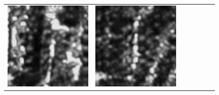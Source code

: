 \documentclass{article}
\begin{document}
\begin{table}[t]
\begin{tabular}{ccccccc}
   			\includegraphics[scale=0.32]{Images/generated_data_80x80_upsampled/168000_00773.jpg}  &
   			\includegraphics[scale=0.32]{Images/generated_data_80x80_upsampled/168000_00806.jpg}  \\
   			

\end{tabular}
\end{table}
\end{document}

